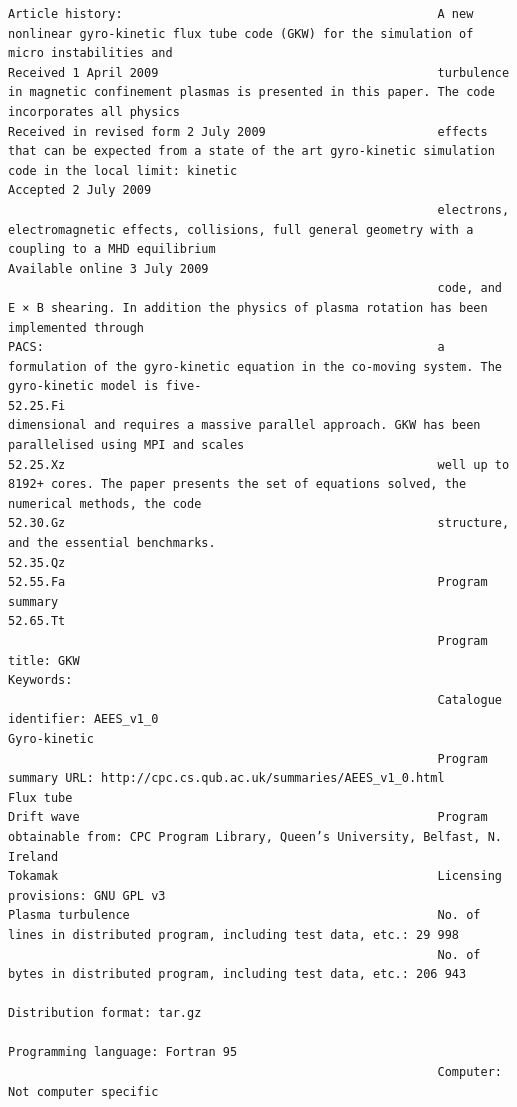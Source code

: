 \documentclass[a4paper]{article}
\newcommand{\gkwpagefont}{\fontsize{6.0pt}{7.55pt}\selectfont}
\begin{document}
\begin{Verbatim}[fontsize=\gkwpagefont]
Article history:                                            A new nonlinear gyro-kinetic flux tube code (GKW) for the simulation of micro instabilities and
Received 1 April 2009                                       turbulence in magnetic confinement plasmas is presented in this paper. The code incorporates all physics
Received in revised form 2 July 2009                        effects that can be expected from a state of the art gyro-kinetic simulation code in the local limit: kinetic
Accepted 2 July 2009
                                                            electrons, electromagnetic effects, collisions, full general geometry with a coupling to a MHD equilibrium
Available online 3 July 2009
                                                            code, and E × B shearing. In addition the physics of plasma rotation has been implemented through
PACS:                                                       a formulation of the gyro-kinetic equation in the co-moving system. The gyro-kinetic model is five-
52.25.Fi                                                    dimensional and requires a massive parallel approach. GKW has been parallelised using MPI and scales
52.25.Xz                                                    well up to 8192+ cores. The paper presents the set of equations solved, the numerical methods, the code
52.30.Gz                                                    structure, and the essential benchmarks.
52.35.Qz
52.55.Fa                                                    Program summary
52.65.Tt
                                                            Program title: GKW
Keywords:
                                                            Catalogue identifier: AEES_v1_0
Gyro-kinetic
                                                            Program summary URL: http://cpc.cs.qub.ac.uk/summaries/AEES_v1_0.html
Flux tube
Drift wave                                                  Program obtainable from: CPC Program Library, Queen’s University, Belfast, N. Ireland
Tokamak                                                     Licensing provisions: GNU GPL v3
Plasma turbulence                                           No. of lines in distributed program, including test data, etc.: 29 998
                                                            No. of bytes in distributed program, including test data, etc.: 206 943
                                                            Distribution format: tar.gz
                                                            Programming language: Fortran 95
                                                            Computer: Not computer specific

\end{Verbatim}
\end{document}

